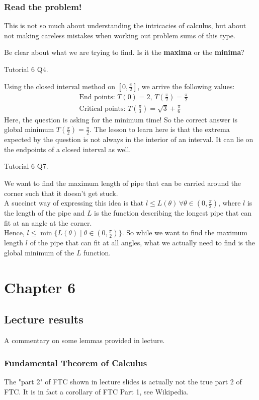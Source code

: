 \documentclass{article}
\begin{document}
\subsubsection{Read the problem!}
This is not so much about understanding the intricacies of calculus, but about not making careless mistakes when working out problem sums of this type.

Be clear about what we are trying to find. Is it the \textbf{maxima} or the \textbf{minima}?

Tutorial 6 Q4.

Using the closed interval method on $[0,\frac{\pi}{2}]$, we arrive the following values:
\begin{align*}
    &\text{End points: }T(0)=2,\, T(\frac{\pi}{2})=\frac{\pi}{2}\\
    &\text{Critical points: } T(\frac{\pi}{3})=\sqrt{3}+\frac{\pi}{6}
\end{align*}
Here, the question is asking for the minimum time! So the correct answer is global minimum $T(\frac{\pi}{2})=\frac{\pi}{2}$.
The lesson to learn here is that the extrema expected by the question is not always in the interior of an interval. It can lie on the endpoints of a closed interval as well.

Tutorial 6 Q7.

We want to find the maximum length of pipe that can be carried around the corner such that it doesn't get stuck.\\
A succinct way of expressing this idea is that $l\leq L(\theta)\, \forall \theta \in(0,\frac{\pi}{2})$, where $l$ is the length of the pipe and $L$ is the function describing the longest pipe that can fit at an angle at the corner.\\
Hence, $l\leq \min\{L(\theta)\mid \theta \in (0,\frac{\pi}{2})\}$. So while we want to find the maximum length $l$ of the pipe that can fit at all angles, what we actually need to find is the global minimum of the $L$ function.


\section{Chapter 6}
\subsection{Lecture results}
A commentary on some lemmas provided in lecture.
\subsubsection{Fundamental Theorem of Calculus}
The "part 2" of FTC shown in lecture slides is actually not the true part 2 of FTC. It is in fact a corollary of FTC Part 1, see Wikipedia.
\end{document}

